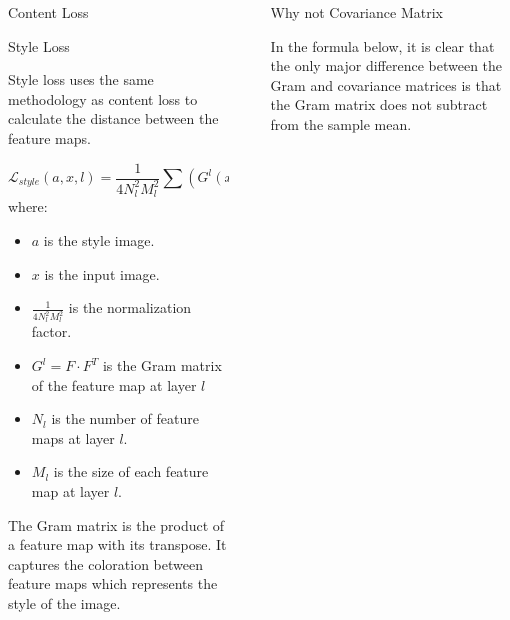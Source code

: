 \documentclass[final]{beamer}
\newlength{\sepwidth}
\newlength{\colwidth}
\newcommand{\separatorcolumn}{\begin{column}{\sepwidth}\end{column}}
\begin{document}
\begin{frame}[t]
\begin{columns}[t]
\begin{column}{\colwidth}
\begin{block}{Content Loss}
  \end{block}

  \begin{block}{Style Loss}

    Style loss uses the same methodology as content loss to calculate the distance between the feature maps.
    
    $$\mathcal{L}_{style}(a, x, l) = \frac{1}{4 N^2_l M^2_l} \sum (G^l(x) - G^l(a))^2 $$
    where:
    \begin{itemize}
        \item $a$ is the style image.
        \item $x$ is the input image.
        \item $\frac{1}{4 N^2_l M^2_l}$ is the normalization factor.
        \item $G^l = F \cdot F^T$ is the Gram matrix of the feature map at layer $l$
        \item $N_l$ is the number of feature maps at layer $l$.
        \item $M_l$ is the size of each feature map at layer $l$.
    \end{itemize}

    The Gram matrix is the product of a feature map with its transpose. It captures the coloration between feature maps which represents the style of the image.

  \end{block}

\end{column}

\separatorcolumn

\begin{column}{\colwidth}

  \begin{alertblock}{Why not Covariance Matrix}

    In the formula below, it is clear that the only major difference between the Gram and covariance matrices is that the Gram matrix does not subtract from the sample mean.
    

\end{alertblock}
\end{column}
\end{columns}
\end{frame}
\end{document}
